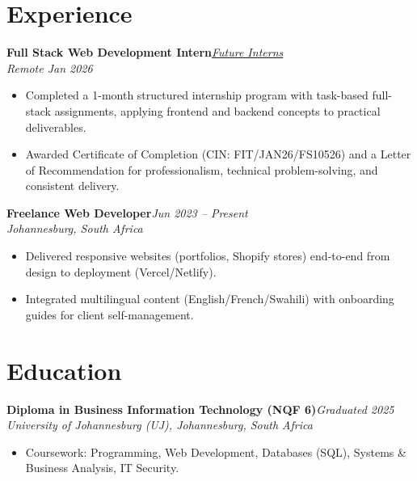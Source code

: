 \documentclass[a4paper,9.5pt]{extarticle}
\newcommand{\entry}[3]{%
  \noindent\begin{minipage}{\linewidth}%
    \textbf{#1}\hfill\textit{\small #2}\\[-1pt]%
    \textit{\small #3}%
  \end{minipage}\vspace{1pt}%
}
\begin{document}
\section{Experience}

\entry{Full Stack Web Development Intern}{\href{https://futureinterns.com}{Future Interns}}{Remote \hfill Jan 2026}
\begin{itemize}[nosep]
\item Completed a 1-month structured internship program with task-based full-stack assignments, applying frontend and backend concepts to practical deliverables.
\item Awarded Certificate of Completion (CIN: FIT/JAN26/FS10526) and a Letter of Recommendation for professionalism, technical problem-solving, and consistent delivery.
\end{itemize}

\vspace{2pt}
\entry{Freelance Web Developer}{Jun 2023 -- Present}{Johannesburg, South Africa}
\begin{itemize}[nosep]
\item Delivered responsive websites (portfolios, Shopify stores) end-to-end from design to deployment (Vercel/Netlify).
\item Integrated multilingual content (English/French/Swahili) with onboarding guides for client self-management.
\end{itemize}

\section{Education}

\entry{Diploma in Business Information Technology (NQF 6)}{Graduated 2025}{University of Johannesburg (UJ), Johannesburg, South Africa}
\begin{itemize}[nosep]
\item Coursework: Programming, Web Development, Databases (SQL), Systems \& Business Analysis, IT Security.
\end{itemize}

\end{document}
